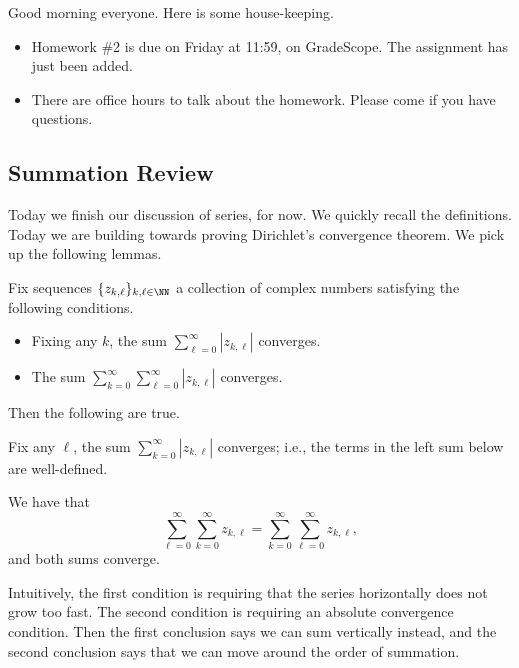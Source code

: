 
Good morning everyone. Here is some house-keeping.
\begin{itemize}
	\item Homework \#2 is due on Friday at 11:59, on GradeScope. The assignment has just been added.
	\item There are office hours to talk about the homework. Please come if you have questions.
\end{itemize}

\subsection{Summation Review}
Today we finish our discussion of series, for now. We quickly recall the definitions.
\seriesdefi*
\convergedefi*
Today we are building towards proving Dirichlet's convergence theorem. We pick up the following lemmas.
\begin{lemma} \label{lem:doublesums}
	Fix sequences $\{z_{k,\ell}\}_{k,\ell\in\NN}$ a collection of complex numbers satisfying the following conditions.
	\begin{itemize}
		\item Fixing any $k$, the sum $\sum_{\ell=0}^\infty|z_{k,\ell}|$ converges.
		\item The sum $\sum_{k=0}^\infty\sum_{\ell=0}^\infty|z_{k,\ell}|$ converges.
	\end{itemize}
	Then the following are true.
	\begin{listalph}
		\item Fix any $\ell$, the sum $\sum_{k=0}^\infty|z_{k,\ell}|$ converges; i.e., the terms in the left sum below are well-defined.
		\item We have that
		\[\sum_{\ell=0}^\infty\sum_{k=0}^\infty z_{k,\ell}=\sum_{k=0}^\infty\sum_{\ell=0}^\infty z_{k,\ell},\]
		and both sums converge.
	\end{listalph}
\end{lemma}
Intuitively, the first condition is requiring that the series horizontally does not grow too fast. The second condition is requiring an absolute convergence condition. Then the first conclusion says we can sum vertically instead, and the second conclusion says that we can move around the order of summation.
